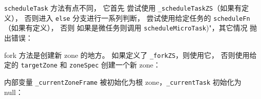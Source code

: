\texttt{scheduleTask} 方法有点不同，
它首先  尝试使用 \texttt{\_scheduleTaskZS}（如果有定义），
否则进入 \texttt{else} 分支进行一系列判断， 尝试使用给定任务的 \texttt{scheduleFn}（如果有定义），
否则  如果是微任务则调用 \texttt{scheduleMicroTask})"，其它情况  抛出错误：




fork 方法是创建新 zone 的地方。
如果定义了 \texttt{\_forkZS}，则使用它，
否则使用给定的 \texttt{targetZone} 和 \texttt{zoneSpec} 创建一个新 zone：




内部变量 \texttt{\_currentZoneFrame} 被初始化为根 zone，\texttt{\_currentTask} 初始化为 null：


